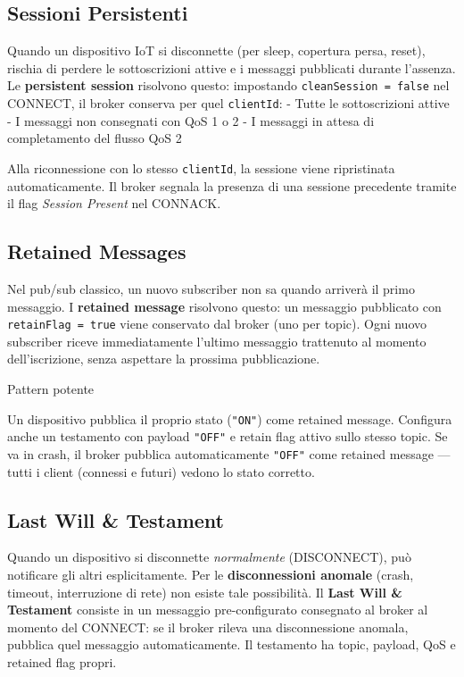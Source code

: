 \documentclass[
  italian,
  openany]{book}
\begin{document}
\subsection{Sessioni Persistenti}\label{sessioni-persistenti-1}

Quando un dispositivo IoT si disconnette (per sleep, copertura persa,
reset), rischia di perdere le sottoscrizioni attive e i messaggi
pubblicati durante l'assenza. Le \textbf{persistent session} risolvono
questo: impostando \texttt{cleanSession\ =\ false} nel CONNECT, il
broker conserva per quel \texttt{clientId}: - Tutte le sottoscrizioni
attive - I messaggi non consegnati con QoS 1 o 2 - I messaggi in attesa
di completamento del flusso QoS 2

Alla riconnessione con lo stesso \texttt{clientId}, la sessione viene
ripristinata automaticamente. Il broker segnala la presenza di una
sessione precedente tramite il flag \emph{Session Present} nel CONNACK.

\subsection{Retained Messages}\label{retained-messages}

Nel pub/sub classico, un nuovo subscriber non sa quando arriverà il
primo messaggio. I \textbf{retained message} risolvono questo: un
messaggio pubblicato con \texttt{retainFlag\ =\ true} viene conservato
dal broker (uno per topic). Ogni nuovo subscriber riceve immediatamente
l'ultimo messaggio trattenuto al momento dell'iscrizione, senza
aspettare la prossima pubblicazione.

\begin{callouttip}{Pattern potente}

Un dispositivo pubblica il proprio stato (\texttt{"ON"}) come retained
message. Configura anche un testamento con payload \texttt{"OFF"} e
retain flag attivo sullo stesso topic. Se va in crash, il broker
pubblica automaticamente \texttt{"OFF"} come retained message --- tutti
i client (connessi e futuri) vedono lo stato corretto.

\end{callouttip}

\subsection{Last Will \& Testament}\label{last-will-testament-1}

Quando un dispositivo si disconnette \emph{normalmente} (DISCONNECT),
può notificare gli altri esplicitamente. Per le \textbf{disconnessioni
anomale} (crash, timeout, interruzione di rete) non esiste tale
possibilità. Il \textbf{Last Will \& Testament} consiste in un messaggio
pre-configurato consegnato al broker al momento del CONNECT: se il
broker rileva una disconnessione anomala, pubblica quel messaggio
automaticamente. Il testamento ha topic, payload, QoS e retained flag
propri.
\end{document}
